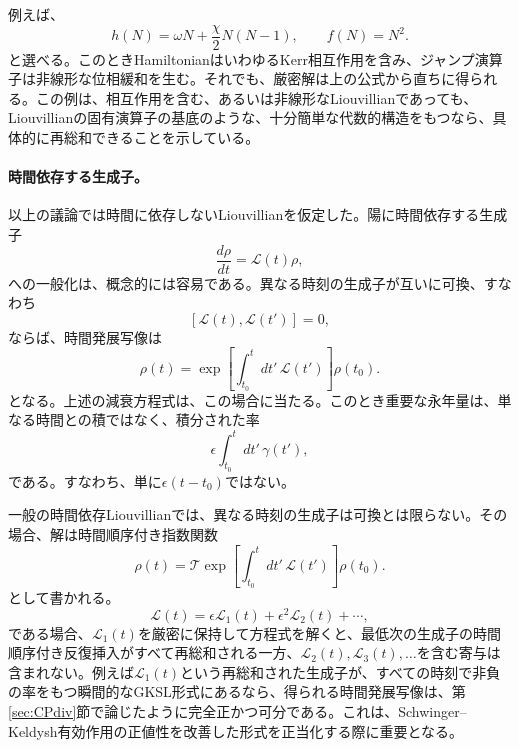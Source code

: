 \documentclass[a4paper,11pt,oneside]{article}
\theoremstyle{definition}
\numberwithin{equation}{section}
\begin{document}
例えば、
\begin{equation}
h(N)
=
\omega N
+
\frac{\chi}{2}N(N-1),
\qquad
f(N)
=
N^{2}.
\end{equation}
と選べる。このときHamiltonianはいわゆるKerr相互作用を含み、ジャンプ演算子は非線形な位相緩和を生む。それでも、厳密解は上の公式から直ちに得られる。この例は、相互作用を含む、あるいは非線形なLiouvillianであっても、Liouvillianの固有演算子の基底のような、十分簡単な代数的構造をもつなら、具体的に再総和できることを示している。



\paragraph{時間依存する生成子。}
以上の議論では時間に依存しないLiouvillianを仮定した。陽に時間依存する生成子
\begin{equation}
\frac{d\rho}{dt}
=
\mathcal{L}(t)\rho,
\end{equation}
への一般化は、概念的には容易である。異なる時刻の生成子が互いに可換、すなわち
\begin{equation}
\left[
\mathcal{L}(t),
\mathcal{L}(t')
\right]
=
0,
\end{equation}
ならば、時間発展写像は
\begin{equation}
\rho(t)
=
\exp\left[
\int_{t_{0}}^{t}dt'\,
\mathcal{L}(t')
\right]
\rho(t_{0}).
\end{equation}
となる。上述の減衰方程式は、この場合に当たる。このとき重要な永年量は、単なる時間との積ではなく、積分された率
\begin{equation}
\epsilon
\int_{t_{0}}^{t}dt'\,
\gamma(t'),
\end{equation}
である。すなわち、単に$\epsilon(t-t_{0})$ではない。



一般の時間依存Liouvillianでは、異なる時刻の生成子は可換とは限らない。その場合、解は時間順序付き指数関数
\begin{equation}
\rho(t)
=
\mathcal{T}
\exp\left[
\int_{t_{0}}^{t}dt'\,
\mathcal{L}(t')
\right]
\rho(t_{0}).
\end{equation}
として書かれる。
\begin{equation}
\mathcal{L}(t)
=
\epsilon\mathcal{L}_{1}(t)
+
\epsilon^{2}\mathcal{L}_{2}(t)
+\cdots,
\end{equation}
である場合、$\mathcal{L}_{1}(t)$を厳密に保持して方程式を解くと、最低次の生成子の時間順序付き反復挿入がすべて再総和される一方、$\mathcal{L}_{2}(t),\mathcal{L}_{3}(t),\ldots$を含む寄与は含まれない。例えば$\mathcal{L}_{1}(t)$という再総和された生成子が、すべての時刻で非負の率をもつ瞬間的なGKSL形式にあるなら、得られる時間発展写像は、第\ref{sec:CPdiv}節で論じたように完全正かつ可分である。これは、Schwinger--Keldysh有効作用の正値性を改善した形式を正当化する際に重要となる。
\end{document}
